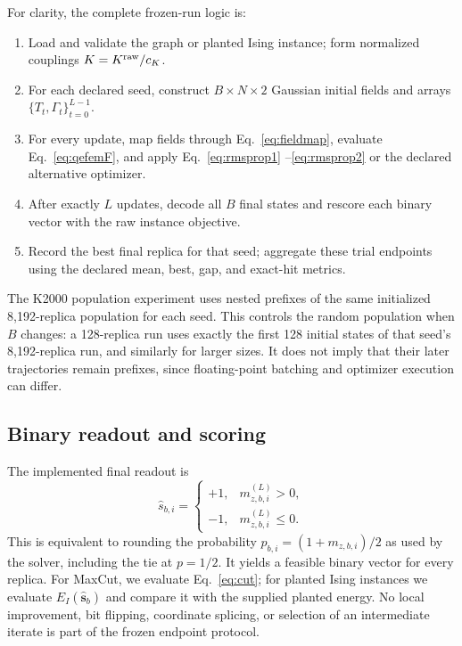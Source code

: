 For clarity, the complete frozen-run logic is:
\begin{enumerate}[label=\arabic*.,leftmargin=2em]
 \item Load and validate the graph or planted Ising instance; form normalized
       couplings $K=K^{\rm raw}/c_K$.
 \item For each declared seed, construct $B\times N\times2$ Gaussian
       initial fields and arrays $\{T_t,\Gamma_t\}_{t=0}^{L-1}$.
 \item For every update, map fields through Eq.~\eqref{eq:fieldmap},
       evaluate Eq.~\eqref{eq:qefemF}, and apply Eq.~\eqref{eq:rmsprop1}
       --\eqref{eq:rmsprop2} or the declared alternative optimizer.
 \item After exactly $L$ updates, decode all $B$ final states and rescore
       each binary vector with the raw instance objective.
 \item Record the best final replica for that seed; aggregate these trial
       endpoints using the declared mean, best, gap, and exact-hit metrics.
\end{enumerate}
The K2000 population experiment uses nested prefixes of the same initialized
8,192-replica population for each seed. This controls the random population
when $B$ changes: a 128-replica run uses exactly the first 128 initial
states of that seed's 8,192-replica run, and similarly for larger sizes.
It does not imply that their later trajectories remain prefixes, since
floating-point batching and optimizer execution can differ.

\subsection{Binary readout and scoring}

The implemented final readout is
\begin{equation}
 \widehat s_{b,i}=\begin{cases}+1,&m^{(L)}_{z,b,i}>0,\\-1,&m^{(L)}_{z,b,i}\leq0.
 \end{cases}
 \label{eq:readout}
\end{equation}
This is equivalent to rounding the probability
$p_{b,i}=(1+m_{z,b,i})/2$ as used by the solver, including the tie at
$p=1/2$. It yields a feasible binary vector for every replica. For
MaxCut, we evaluate Eq.~\eqref{eq:cut}; for planted Ising instances we
evaluate $E_I(\widehat{\bm s}_b)$ and compare it with the supplied planted
energy. No local improvement, bit flipping, coordinate splicing, or
selection of an intermediate iterate is part of the frozen endpoint
protocol.

